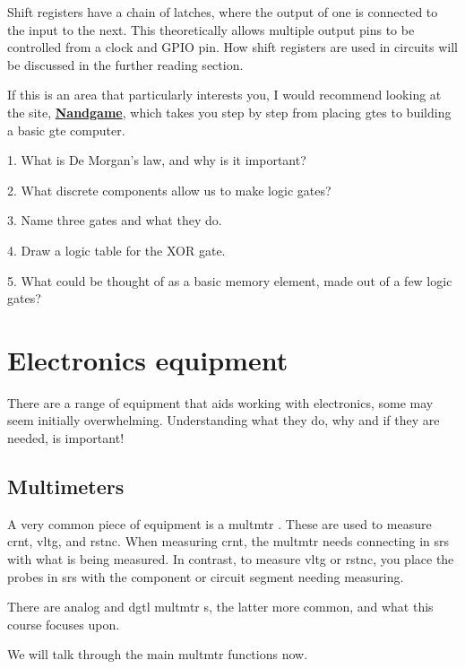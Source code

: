 \documentclass[a4paper,11pt]{report}
\newcommand{\Quiz}[1] %
{
\par\noindent %
\phantomsection %
\todo[inline, color=blue!30]{\textbf{#1}} %
\vspace{1em} %
}
\let\oldhref\href %
\renewcommand{\href}[2]{\oldhref{#1}{\bfseries#2}}
\begin{document}
Shift registers have a chain of latches, where the output of one is connected to the input to the next. This theoretically allows multiple output pins to be controlled from a clock and GPIO pin. How shift registers are used in circuits will be discussed in the further reading section.

If this is an area that particularly interests you, I would recommend looking at the site, \href{https://nandgame.com/}{Nandgame}, which takes you step by step from placing \gls{gte}s to building a basic \gls{gte} computer.

\Quiz{Quiz}

1. What is De Morgan's law, and why is it important?

2. What discrete components allow us to make logic gates?

3. Name three gates and what they do.

4. Draw a logic table for the XOR gate.

5. What could be thought of as a basic memory element, made out of a few logic gates?

\pagebreak

\section{Electronics equipment}

There are a range of equipment that aids working with electronics, some may seem initially overwhelming. Understanding what they do, why and if they are needed, is important!

\vspace*{1\baselineskip}

\subsection{Multimeters}

A very common piece of equipment is a \gls{multmtr} . These are used to measure \gls{crnt}, \gls{vltg}, and \gls{rstnc}. When measuring \gls{crnt}, the \gls{multmtr}  needs connecting in \gls{srs} with what is being measured. In contrast, to measure \gls{vltg} or \gls{rstnc}, you place the probes in \gls{srs} with the component or circuit segment needing measuring.

There are analog and \gls{dgtl} \gls{multmtr} s, the latter more common, and what this course focuses upon.

We will talk through the main \gls{multmtr}  functions now.
\end{document}

